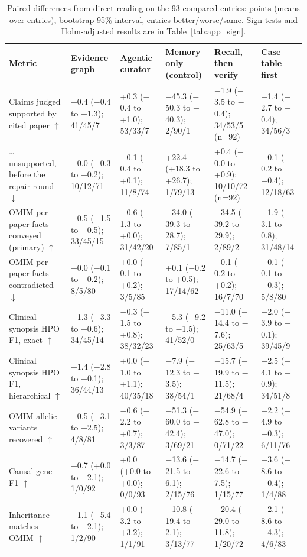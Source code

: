 \documentclass{article} %
\begin{document}
\begin{table}[!htbp]
\caption{Paired differences from direct reading on the 93 compared entries: points (means over entries), bootstrap 95\% interval, entries better/worse/same. Sign tests and Holm-adjusted results are in Table~\ref{tab:app_sign}.}
\label{tab:app_paired}
\scriptsize
\begin{tabularx}{\linewidth}{>{\raggedright\arraybackslash}p{3.0cm}>{\centering\arraybackslash}X>{\centering\arraybackslash}X>{\centering\arraybackslash}X>{\centering\arraybackslash}X>{\centering\arraybackslash}X}
\toprule
Metric & Evidence graph & Agentic curator & Memory only (control) & Recall, then verify & Case table first \\
\midrule
Claims judged supported by cited paper $\uparrow$ & +0.4 ($-$0.4 to +1.3); 41/45/7 & +0.3 ($-$0.4 to +1.0); 53/33/7 & $-$45.3 ($-$50.3 to $-$40.3); 2/90/1 & $-$1.9 ($-$3.5 to $-$0.4); 34/53/5 (n=92) & $-$1.4 ($-$2.7 to $-$0.4); 34/56/3 \\
\ldots{} unsupported, before the repair round $\downarrow$ & +0.0 ($-$0.3 to +0.2); 10/12/71 & $-$0.1 ($-$0.4 to +0.1); 11/8/74 & +22.4 (+18.3 to +26.7); 1/79/13 & +0.4 ($-$0.0 to +0.9); 10/10/72 (n=92) & +0.1 ($-$0.2 to +0.4); 12/18/63 \\
OMIM per-paper facts conveyed (primary) $\uparrow$ & $-$0.5 ($-$1.5 to +0.5); 33/45/15 & $-$0.6 ($-$1.3 to +0.0); 31/42/20 & $-$34.0 ($-$39.3 to $-$28.7); 7/85/1 & $-$34.5 ($-$39.2 to $-$29.9); 2/89/2 & $-$1.9 ($-$3.1 to $-$0.8); 31/48/14 \\
OMIM per-paper facts contradicted $\downarrow$ & +0.0 ($-$0.1 to +0.2); 8/5/80 & +0.0 ($-$0.1 to +0.2); 3/5/85 & +0.1 ($-$0.2 to +0.5); 17/14/62 & $-$0.1 ($-$0.2 to +0.2); 16/7/70 & +0.1 ($-$0.1 to +0.3); 5/8/80 \\
Clinical synopsis HPO F1, exact $\uparrow$ & $-$1.3 ($-$3.3 to +0.6); 34/45/14 & $-$0.3 ($-$1.5 to +0.8); 38/32/23 & $-$5.3 ($-$9.2 to $-$1.5); 41/52/0 & $-$11.0 ($-$14.4 to $-$7.6); 25/63/5 & $-$2.0 ($-$3.9 to $-$0.1); 39/45/9 \\
Clinical synopsis HPO F1, hierarchical $\uparrow$ & $-$1.4 ($-$2.8 to $-$0.1); 36/44/13 & +0.0 ($-$1.0 to +1.1); 40/35/18 & $-$7.9 ($-$12.3 to $-$3.5); 38/54/1 & $-$15.7 ($-$19.9 to $-$11.5); 21/68/4 & $-$2.5 ($-$4.1 to $-$0.9); 34/51/8 \\
OMIM allelic variants recovered $\uparrow$ & $-$0.5 ($-$3.1 to +2.5); 4/8/81 & $-$0.6 ($-$2.2 to +0.7); 3/3/87 & $-$51.3 ($-$60.0 to $-$42.4); 3/69/21 & $-$54.9 ($-$62.8 to $-$47.0); 0/71/22 & $-$2.2 ($-$4.9 to +0.3); 6/11/76 \\
Causal gene F1 $\uparrow$ & +0.7 (+0.0 to +2.1); 1/0/92 & +0.0 (+0.0 to +0.0); 0/0/93 & $-$13.6 ($-$21.5 to $-$6.1); 2/15/76 & $-$14.7 ($-$22.6 to $-$7.5); 1/15/77 & $-$3.6 ($-$8.6 to +0.4); 1/4/88 \\
Inheritance matches OMIM $\uparrow$ & $-$1.1 ($-$5.4 to +2.1); 1/2/90 & +0.0 ($-$3.2 to +3.2); 1/1/91 & $-$10.8 ($-$19.4 to $-$2.1); 3/13/77 & $-$20.4 ($-$29.0 to $-$11.8); 1/20/72 & $-$2.1 ($-$8.6 to +4.3); 4/6/83 \\
\bottomrule
\end{tabularx}
\end{table}
\end{document}
